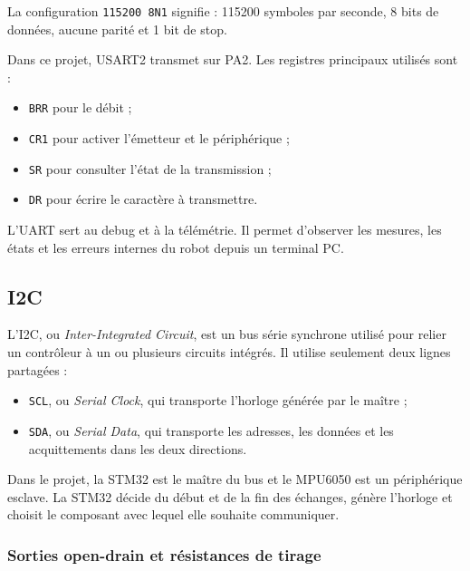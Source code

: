 \documentclass[11pt,a4paper]{article}
\begin{document}
	La configuration \texttt{115200 8N1} signifie : 115200 symboles par seconde, 8 bits de données, aucune parité et 1 bit de stop.
	
	Dans ce projet, USART2 transmet sur PA2. Les registres principaux utilisés sont :
	
	\begin{itemize}
		\item \texttt{BRR} pour le débit ;
		\item \texttt{CR1} pour activer l'émetteur et le périphérique ;
		\item \texttt{SR} pour consulter l'état de la transmission ;
		\item \texttt{DR} pour écrire le caractère à transmettre.
	\end{itemize}
	
	L'UART sert au debug et à la télémétrie. Il permet d'observer les mesures, les états et les erreurs internes du robot depuis un terminal PC.
	
	\subsection*{I2C}
	
	L'I2C, ou \textit{Inter-Integrated Circuit}, est un bus série synchrone utilisé pour relier un contrôleur à un ou plusieurs circuits intégrés. Il utilise seulement deux lignes partagées :
	
	\begin{itemize}
		\item \texttt{SCL}, ou \textit{Serial Clock}, qui transporte l'horloge générée par le maître ;
		\item \texttt{SDA}, ou \textit{Serial Data}, qui transporte les adresses, les données et les acquittements dans les deux directions.
	\end{itemize}
	
	Dans le projet, la STM32 est le maître du bus et le MPU6050 est un périphérique esclave. La STM32 décide du début et de la fin des échanges, génère l'horloge et choisit le composant avec lequel elle souhaite communiquer.
	
	\begin{center}
	\end{center}
	
	\subsubsection*{Sorties open-drain et résistances de tirage}
	
\end{document}
